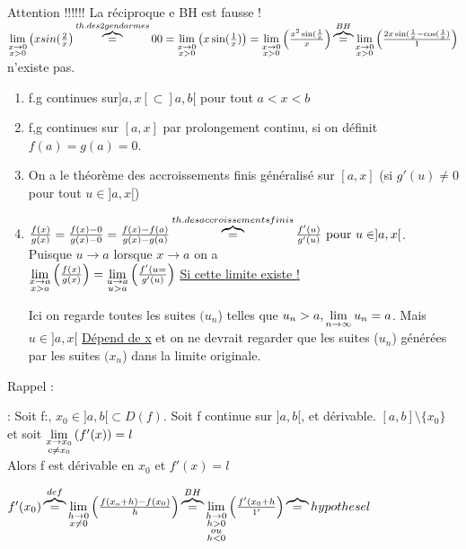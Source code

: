 \documentclass[12pt,a4paper]{article}
\begin{document}
{
Attention !!!!!! La réciproque e BH est fausse !\\
$\lim\limits_{\substack{x\to 0 \\ x > 0}}\left(x \\sin(\frac{2}{x}\right) \overbrace{=}^{th. des 2 gendarmes} 0\\
0 = \lim\limits_{\substack{x\to 0 \\ x > 0}}\left(x\sin(\frac{1}{x})\right) = \lim\limits_{\substack{x\to 0 \\ x >0}}\left(\frac{x^2\sin(\frac{1}{x}}{x}\right) \overbrace{=}^{BH} \lim\limits_{\substack{x\to 0 \\ x > 0}}\left(\frac{2x\sin(\frac{1}{x} - \cos(\frac{1}{x})}{1}\right)$ n'existe pas.	

\begin{enumerate}[label=\roman*)]
	\item f.g continues sur$]a,x[ \subset ]a,b[$ pour tout $a < x<b$
	\item f,g continues sur $[a,x]$ par prolongement continu, si on définit $f(a) = g(a) = 0$.
	\item On a le théorème des accroissements finis généralisé sur $[a,x]$ (si $g'(u) \neq 0 $ pour tout $u \in ]a,x[$)
	\item $\frac{f(x)}{g(x)} = \frac{f(x) - 0}{g(x) - 0} = \frac{f(x)-f(a)}{g(x)-g(a)} \overbrace{=}^{th. des accroissements finis} \frac{f'(u)}{g'(u)} \mbox{ pour } u \in ]a,x[$.\\
	Puisque $u \to a$ lorsque $x\to a$ on a \\
	$\lim\limits_{\substack{x\to a \\ x > a}}\left(\frac{f(x)}{g(x)}\right) = \lim\limits_{\substack{u \to a \\ u > a}}\left(\frac{f'(u=}{g'(u)}\right)$ \underline{Si cette limite existe !}\\
	\begin{boite}
	Ici on regarde toutes les suites $(u_n$) telles que $u_n  > a, \lim\limits_{n \to \infty}u_n = a$. Mais $u \in ]a,x[$ \underline{Dépend de x} et on ne devrait regarder que les suites ($u_n$) générées par les suites $(x_n$) dans la limite originale.
	\end{boite}
\end{enumerate}
Rappel : \begin{boite}
	\Theoreme : Soit f:\rtor, $x_0 \in ]a,b[ \subset D(f)$. Soit f continue sur $]a,b[$, et dérivable. $[a,b]\setminus\{x_0\}$ et soit $\lim\limits_{\substack{x \to x_0 \\ c \neq x_0}}\left(f'(x)\right) = l$\\
	Alors f est dérivable en $x_0$ et $f'(x) 
	= l$
\end{boite}
$f'(x_0) \overbrace{=}^{def} \lim\limits_{\substack{h \to 0 \\ x \neq 0}}\left(\frac{f(x_o+h) - f(x_0)}{h}\right) \overbrace{=}^{BH} \lim\limits_{\substack{h\to 0 \\ h > 0 \\ ou \\ h < 0}} \left( \frac{f'(x_0+h}{1'}\right) \overbrace{=}{hypothese} l$
}
\end{document}
